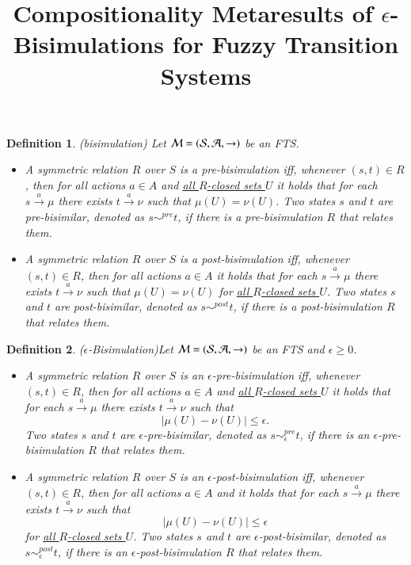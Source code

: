 \documentclass[contract,10pt]{elsarticle}
\newtheorem{defi}{Definition}
\newenvironment{definition}{\begin{defi} \rm }{\end{defi}}
\newcommand{\R}[1]{{\color{red}   #1}}
\begin{document}
\begin{frontmatter}
\title{Compositionality Metaresults of $\epsilon$-Bisimulations for Fuzzy Transition Systems} %
\end{frontmatter}


\begin{definition}(bisimulation) \label{bisimulation} Let $\cal {M}=(S,A,\rightarrow)$ be an FTS.

\begin{itemize}

\item A \R {symmetric} relation $R$ over $S$ is a \textit{pre}-bisimulation iff, whenever $(s,t)\in R$, then for all actions $a\in
A$ and \underline{all $R$-closed sets $U$} it holds that for each $s\xrightarrow{a}\mu$ there exists
$t\xrightarrow{a}\nu$ such that $\mu(U)=\nu(U)$. Two states $s$ and $t$ are pre-bisimilar, denoted as $s\sim^{pre} t$, if there is a pre-bisimulation $R$ that relates them.


\item  A \R {symmetric} relation $R$ over $S$ is a \textit{post}-bisimulation iff, whenever $(s,t)\in R$, then for all actions $a\in
A$ it holds that for each $s\xrightarrow{a}\mu$ there exists
$t\xrightarrow{a}\nu$ such that $ \mu(U)=\nu(U)$ for \underline {all $R$-closed sets $U$}. Two states $s$ and $t$ are post-bisimilar, denoted as $s\sim^{post} t$, if there is a post-bisimulation $R$ that relates them.

\end{itemize}

\end{definition}

\begin{definition} ($\epsilon$-Bisimulation)\label{approximate bisimulation}
 Let $\cal {M}=(S,A,\rightarrow)$ be an FTS and $\epsilon\geq 0$.

 \begin{itemize}

\item A \R {symmetric}
relation $R$ over $S$ is an $\epsilon$-pre-bisimulation iff, whenever $(s,t)\in R$, then for all actions $a\in
A$ and \underline{all $R$-closed sets $U$} it holds that for each $s\xrightarrow{a}\mu$ there exists
$t\xrightarrow{a}\nu$ such that $$|\mu(U)-\nu(U)|\leq \epsilon.$$ Two states  $s$ and $t$ are $\epsilon$-pre-bisimilar, denoted as $s\sim^{pre}_{\epsilon} t$, if there is an $\epsilon$-pre-bisimulation $R$ that relates them.

\item A \R {symmetric}
relation $R$ over $S$ is an $\epsilon$-post-bisimulation iff, whenever $(s,t)\in R$, then for all actions $a\in
A$ and it holds that for each $s\xrightarrow{a}\mu$ there exists
$t\xrightarrow{a}\nu$ such that $$|\mu(U)-\nu(U)|\leq \epsilon$$ for \underline {all $R$-closed sets $U$}. Two states  $s$ and $t$ are $\epsilon$-post-bisimilar, denoted as $s\sim^{post}_{\epsilon} t$, if there is an $\epsilon$-post-bisimulation $R$ that relates them.

\end{itemize}
\end{definition}
\end{document}
